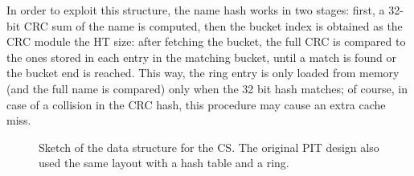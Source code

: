 \documentclass[12pt,a4paper,twoside]{book}
\begin{document}
In order to exploit this structure, the name hash works in two stages: first, a 32-bit \gls{CRC} sum of the name is computed, then the bucket index is obtained as the CRC module the HT size: after fetching the bucket, the full \gls{CRC} is compared to the ones stored in each entry in the matching bucket, until a match is found or the bucket end is reached. This way, the ring entry is only loaded from memory (and the full name is compared) only when the 32 bit hash matches; of course, in case of a collision in the CRC hash, this procedure may cause an extra cache miss.

\begin{figure}[htb]
  \begin{center}
    \caption[Sketch for the data structure for the CS and orignal PIT.]{Sketch of the data structure for the CS. The original PIT design also used the same layout with a hash table and a ring.}
    \label{fig:augustus.ht_ring}
  \end{center}
\end{figure}
\end{document}
